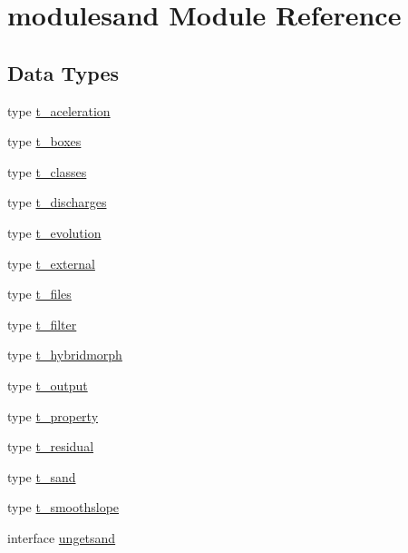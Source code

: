 \hypertarget{namespacemodulesand}{}\section{modulesand Module Reference}
\label{namespacemodulesand}
\subsection*{Data Types}
\begin{DoxyCompactItemize}
\item 
type \mbox{\hyperlink{structmodulesand_1_1t__aceleration}{t\+\_\+aceleration}}
\item 
type \mbox{\hyperlink{structmodulesand_1_1t__boxes}{t\+\_\+boxes}}
\item 
type \mbox{\hyperlink{structmodulesand_1_1t__classes}{t\+\_\+classes}}
\item 
type \mbox{\hyperlink{structmodulesand_1_1t__discharges}{t\+\_\+discharges}}
\item 
type \mbox{\hyperlink{structmodulesand_1_1t__evolution}{t\+\_\+evolution}}
\item 
type \mbox{\hyperlink{structmodulesand_1_1t__external}{t\+\_\+external}}
\item 
type \mbox{\hyperlink{structmodulesand_1_1t__files}{t\+\_\+files}}
\item 
type \mbox{\hyperlink{structmodulesand_1_1t__filter}{t\+\_\+filter}}
\item 
type \mbox{\hyperlink{structmodulesand_1_1t__hybridmorph}{t\+\_\+hybridmorph}}
\item 
type \mbox{\hyperlink{structmodulesand_1_1t__output}{t\+\_\+output}}
\item 
type \mbox{\hyperlink{structmodulesand_1_1t__property}{t\+\_\+property}}
\item 
type \mbox{\hyperlink{structmodulesand_1_1t__residual}{t\+\_\+residual}}
\item 
type \mbox{\hyperlink{structmodulesand_1_1t__sand}{t\+\_\+sand}}
\item 
type \mbox{\hyperlink{structmodulesand_1_1t__smoothslope}{t\+\_\+smoothslope}}
\item 
interface \mbox{\hyperlink{interfacemodulesand_1_1ungetsand}{ungetsand}}
\end{DoxyCompactItemize}
